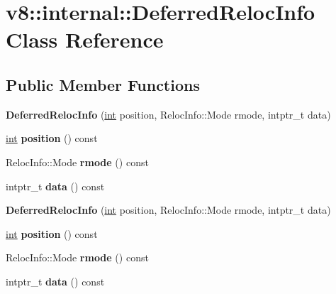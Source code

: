 \hypertarget{classv8_1_1internal_1_1DeferredRelocInfo}{}\section{v8\+:\+:internal\+:\+:Deferred\+Reloc\+Info Class Reference}
\label{classv8_1_1internal_1_1DeferredRelocInfo}
\subsection*{Public Member Functions}
\begin{DoxyCompactItemize}
\item 
\mbox{\label{classv8_1_1internal_1_1DeferredRelocInfo_a61bf993ce18b8e080067e99b5984aa51}} 
{\bfseries Deferred\+Reloc\+Info} (\mbox{\hyperlink{classint}{int}} position, Reloc\+Info\+::\+Mode rmode, intptr\+\_\+t data)
\item 
\mbox{\label{classv8_1_1internal_1_1DeferredRelocInfo_aabe3d3136115a05e6002e43cb9a0fae8}} 
\mbox{\hyperlink{classint}{int}} {\bfseries position} () const
\item 
\mbox{\label{classv8_1_1internal_1_1DeferredRelocInfo_a3d4ac84357c9abb7aad83f3bc129e058}} 
Reloc\+Info\+::\+Mode {\bfseries rmode} () const
\item 
\mbox{\label{classv8_1_1internal_1_1DeferredRelocInfo_ada51f11fbc049045dcc8c86cc07466d1}} 
intptr\+\_\+t {\bfseries data} () const
\item 
\mbox{\label{classv8_1_1internal_1_1DeferredRelocInfo_a61bf993ce18b8e080067e99b5984aa51}} 
{\bfseries Deferred\+Reloc\+Info} (\mbox{\hyperlink{classint}{int}} position, Reloc\+Info\+::\+Mode rmode, intptr\+\_\+t data)
\item 
\mbox{\label{classv8_1_1internal_1_1DeferredRelocInfo_aabe3d3136115a05e6002e43cb9a0fae8}} 
\mbox{\hyperlink{classint}{int}} {\bfseries position} () const
\item 
\mbox{\label{classv8_1_1internal_1_1DeferredRelocInfo_a3d4ac84357c9abb7aad83f3bc129e058}} 
Reloc\+Info\+::\+Mode {\bfseries rmode} () const
\item 
\mbox{\label{classv8_1_1internal_1_1DeferredRelocInfo_ada51f11fbc049045dcc8c86cc07466d1}} 
intptr\+\_\+t {\bfseries data} () const
\end{DoxyCompactItemize}


